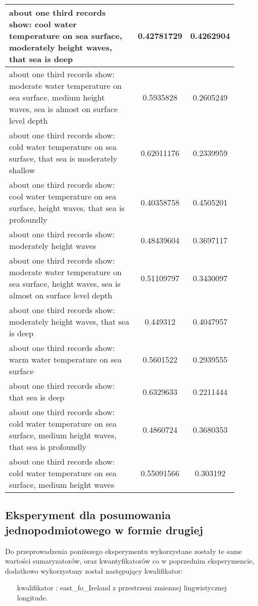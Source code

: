 \documentclass{article}
\begin{document}
\begin{longtable}{|p{0.9\linewidth}|c|c|}
about one third records show: cool water temperature on sea surface, moderately height waves, that sea is deep & 0.42781729 & 0.4262904 \\ \hline
about one third records show: moderate water temperature on sea surface, medium height waves, sea is almost on surface level depth & 0.5935828 & 0.2605249 \\ \hline
about one third records show: cold water temperature on sea surface, that sea is moderately shallow & 0.62011176 & 0.2339959 \\ \hline
about one third records show: cool water temperature on sea surface, height waves, that sea is profoundly & 0.40358758 & 0.4505201 \\ \hline
about one third records show: moderately height waves & 0.48439604 & 0.3697117 \\ \hline
about one third records show: moderate water temperature on sea surface, height waves, sea is almost on surface level depth & 0.51109797 & 0.3430097 \\ \hline
about one third records show: moderately height waves, that sea is deep & 0.449312 & 0.4047957 \\ \hline
about one third records show: warm water temperature on sea surface & 0.5601522 & 0.2939555 \\ \hline
about one third records show: that sea is deep & 0.6329633 & 0.2211444 \\ \hline
about one third records show: cold water temperature on sea surface, medium height waves, that sea is profoundly & 0.4860724 & 0.3680353 \\ \hline
about one third records show: cold water temperature on sea surface, medium height waves & 0.55091566 & 0.303192 \\ \hline
\hline
\end{longtable}

\subsection{Eksperyment dla posumowania jednopodmiotowego w formie drugiej}

Do przeprowadzenia poniższego eksperymentu wykorzystane zostały te same wartości sumaryzatorów, oraz kwantyfikatorów co w poprzednim eksperymencie, dodatkowo wykorzystany został następujący kwalifikator:

\begin{itemize}
    \item[kwalifikator]: east\_fo\_Ireland z przestrzeni zmiennej lingwistycznej longitude.
\end{itemize}
\end{document}
